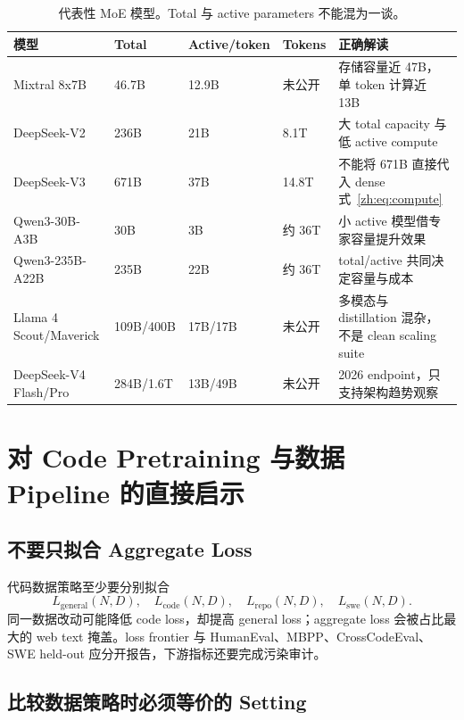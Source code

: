 \documentclass[UTF8,10pt,a4paper,fontset=none]{ctexart}
\begin{document}
\begin{table}[htbp]
\centering
\small
\caption{代表性 MoE 模型。Total 与 active parameters 不能混为一谈。}
\label{zh:tab:moe}
\begin{tabularx}{\textwidth}{Y R{2.0cm} R{2.0cm} R{1.7cm} Y}
\toprule
模型 & Total & Active/token & Tokens & 正确解读 \\
\midrule
Mixtral 8x7B & 46.7B & 12.9B & 未公开 & 存储容量近 47B，单 token 计算近 13B\cite{zh:mixtral2024} \\
DeepSeek-V2 & 236B & 21B & 8.1T & 大 total capacity 与低 active compute\cite{zh:deepseekv2} \\
DeepSeek-V3 & 671B & 37B & 14.8T & 不能将 671B 直接代入 dense 式~\eqref{zh:eq:compute}\cite{zh:deepseekv3} \\
Qwen3-30B-A3B & 30B & 3B & 约 36T & 小 active 模型借专家容量提升效果\cite{zh:qwen3} \\
Qwen3-235B-A22B & 235B & 22B & 约 36T & total/active 共同决定容量与成本\cite{zh:qwen3} \\
Llama 4 Scout/Maverick & 109B/400B & 17B/17B & 未公开 & 多模态与 distillation 混杂，不是 clean scaling suite\cite{zh:llama4} \\
DeepSeek-V4 Flash/Pro & 284B/1.6T & 13B/49B & 未公开 & 2026 endpoint，只支持架构趋势观察\cite{zh:deepseekv4} \\
\bottomrule
\end{tabularx}
\end{table}

\section{对 Code Pretraining 与数据 Pipeline 的直接启示}

\subsection{不要只拟合 Aggregate Loss}

代码数据策略至少要分别拟合
\begin{equation}
  L_{\mathrm{general}}(N,D),\quad L_{\mathrm{code}}(N,D),\quad
  L_{\mathrm{repo}}(N,D),\quad L_{\mathrm{swe}}(N,D).
  \label{zh:eq:domain-losses}
\end{equation}
同一数据改动可能降低 code loss，却提高 general loss；aggregate loss 会被占比最大的 web text 掩盖。loss frontier 与 HumanEval、MBPP、CrossCodeEval、SWE held-out 应分开报告，下游指标还要完成污染审计。

\subsection{比较数据策略时必须等价的 Setting}
\end{document}
